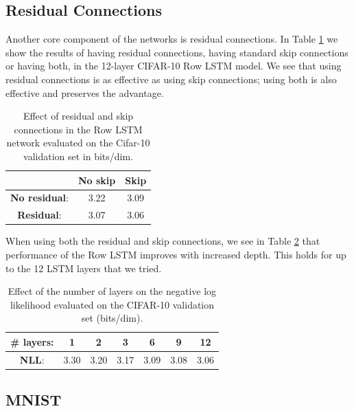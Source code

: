 \subsection{Residual Connections}
Another core component of the networks is residual connections. In Table \ref{table:effect_skipconnections} we show the results of having residual connections, having standard skip connections or having both, in the 12-layer CIFAR-10 Row LSTM model. We see that using residual connections is as effective as using skip connections; using both is also effective and preserves the advantage. 

\begin{table}[h]
	\begin{center}
	\begin{tabular}{ccc}
		\toprule
		 & \textbf{No skip} & \textbf{Skip} \\ 
		\midrule
		\textbf{No residual}: & 3.22 & 3.09 \\ 
	    \textbf{Residual}: & 3.07 & 3.06 \\ 
	    \bottomrule
	\end{tabular}
	\end{center}
\vspace{-0.3cm}
\caption{Effect of residual and skip connections in the Row LSTM network evaluated on the Cifar-10 validation set in bits/dim.}
\label{table:effect_skipconnections}
\end{table}

When using both the residual and skip connections, we see in Table \ref{table:effect_of_layers} that performance of the Row LSTM improves with increased depth. This holds for up to the 12 LSTM layers that we tried.

\begin{table}[h]
\centering
	\begin{tabular}{ccccccc}
		\toprule
		\textbf{\# layers}: & 1 & 2 & 3 & 6 & 9 & 12 \\ 
	    \midrule
	    \textbf{NLL}: & 3.30 & 3.20 & 3.17 & 3.09 & 3.08 & 3.06 \\
	    \bottomrule
	\end{tabular}
\caption{Effect of the number of layers on the negative log likelihood evaluated on the CIFAR-10 validation set (bits/dim).}
\label{table:effect_of_layers}
\end{table}

\subsection{MNIST}

